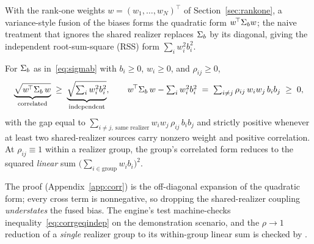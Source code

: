 With the rank-one weights $w=(w_1,\dots,w_N)^{\!\top}$ of Section~\ref{sec:rankone},
a variance-style fusion of the biases forms the quadratic form $w^{\!\top}\Sigma_{b}{}w$;
the naive treatment that ignores the shared realizer replaces $\Sigma_{b}{}$ by its
diagonal, giving the independent root-sum-square (RSS) form $\sum_i w_i^2 b_i^2$.

\begin{theorem}
\label{thm:corr}
For $\Sigma_{b}{}$ as in~\eqref{eq:sigmab} with $b_i\ge0$, $w_i\ge0$, and $\rho_{ij}\ge0$,
\begin{equation}
  \underbrace{\sqrt{w^{\!\top}\Sigma_{b}{}\,w}}_{\text{correlated}}
  \;\ge\;
  \underbrace{\sqrt{\textstyle\sum_i w_i^2 b_i^2}}_{\text{independent}},
  \qquad
  w^{\!\top}\Sigma_{b}{}\,w - \textstyle\sum_i w_i^2 b_i^2
  \;=\; \sum_{\substack{i\neq j}} \rho_{ij}\,w_i w_j\,b_i b_j \;\ge\;0,
  \label{eq:corrgeqindep}
\end{equation}
with the gap equal to $\sum_{i\neq j,\ \text{same realizer}} w_i w_j\,\rho_{ij}\,b_i
b_j$ and strictly positive whenever at least two shared-realizer sources carry
nonzero weight and positive correlation. At $\rho_{ij}\equiv1$ within a realizer
group, the group's correlated form reduces to the squared \emph{linear} sum
$\big(\sum_{i\in\text{group}} w_i b_i\big)^2$.
\end{theorem}

The proof (Appendix~\ref{app:corr}) is the off-diagonal expansion of the quadratic
form; every cross term is nonnegative, so dropping the shared-realizer coupling
\emph{understates} the fused bias. The engine's
 test
machine-checks inequality~\eqref{eq:corrgeqindep} on the demonstration scenario, and
the $\rho\!\to\!1$ reduction of a \emph{single} realizer group to its within-group
linear sum is checked by .

